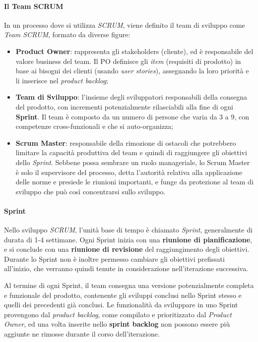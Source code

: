 \documentclass[a4paper,12pt]{report}
\begin{document}
				\paragraph{Il Team SCRUM}
				In un processo dove si utilizza \emph{SCRUM}, viene definito il team di sviluppo come \emph{Team SCRUM}, formato da diverse figure:
				\begin{itemize}
					\item \textbf{Product Owner}: rappresenta gli stakeholders (cliente), ed è responsabile del valore business del team.
					Il PO definisce gli \emph{item} (requisiti di prodotto) in base ai bisogni dei clienti (usando \emph{user stories}),
					assegnando la loro priorità e li inserisce nel \emph{product backlog};
					\item \textbf{Team di Sviluppo}: l'insieme degli sviluppatori responsabili della consegna del prodotto, con incrementi
					potenzialmente rilasciabili alla fine di ogni \textbf{Sprint}. Il team è composto da un numero di persone che varia da 3 a 9, con competenze cross-funzionali e che si auto-organizza;
					\item \textbf{Scrum Master}: responsabile della rimozione di ostacoli che potrebbero limitare la capacità produttiva
					del team e quindi di raggiungere gli obiettivi dello \emph{Sprint}. Sebbene possa sembrare un ruolo manageriale,
					lo Scrum Master è solo il supervisore del processo, detta l'autorità relativa alla applicazione delle norme e presiede
					le riunioni importanti, e funge da protezione al team di sviluppo che può così concentrarsi sullo sviluppo.
				\end{itemize}
			
				\paragraph{Sprint}
				Nello sviluppo \emph{SCRUM}, l'unità base di tempo è chiamato \emph{Sprint}, generalmente di durata di 1-4 settimane.
				Ogni Sprint inizia con una \textbf{riunione di pianificazione}, e si conclude con una \textbf{riunione di revisione} del raggiungimento
				degli obiettivi. Durante lo Sprint non è inoltre permesso cambiare gli obiettivi prefissati all'inizio, che verranno
				quindi tenute in considerazione nell'iterazione successiva.
				
				Al termine di ogni Sprint, il team consegna una versione potenzialmente completa e funzionale del prodotto, contenente
				gli sviluppi conclusi nello Sprint stesso e quelli dei precedenti già conclusi.
				Le funzionalità da sviluppare in uno Sprint provengono dal \emph{product backlog}, come compilato e prioritizzato dal
				\emph{Product Owner}, ed una volta inserite nello \textbf{sprint backlog} non possono essere più aggiunte ne rimosse
				durante il corso dell'iterazione.
				
\end{document}
